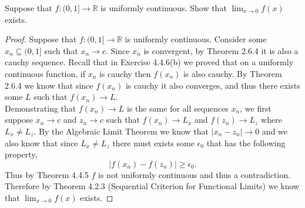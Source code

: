 \documentclass[12pt]{article}
\makeatletter
\theoremstyle{homework}
\newenvironment{exercise}[1]
{\def\@currentlabel{#1}\exercisecore}
{\endexercisecore}
\newcommand{\Reals}{\ensuremath{\mathbb R}}
\makeatother
\begin{document}
\begin{exercise}{3} Suppose that $f: (0,1]\to \Reals$ is uniformly continuous. Show that $\lim_{x\to 0} f(x)$ exists. 

  \begin{proof}

    Suppose that $f: (0,1]\to \Reals$ is uniformly continuous. Consider some $x_n \subseteq (0,1]$ such that $x_n \to c$. Since $x_n$ is convergent, by 
    Theorem 2.6.4 it is also a cauchy sequence. Recall that in Exercise 4.4.6(b) we proved that on a uniformly continuous function, if $x_n$ is cauchy then $f(x_n)$ is also cauchy.
    By Theorem 2.6.4 we know that since $f(x_n)$ is cauchy it also converges, and thus there exists some $L$ such that $f(x_n) \to L$.\\

    Demonstrating that $f(x_n) \to L$ is the same for all sequences $x_n$, we first suppose $x_n \to c$ and $z_n \to c$ such that $f(x_n)\to L_x$ and $f(z_n)\to L_z$
    where $L_x \neq L_z$. By the Algebraic Limit Theorem we know that $|x_n - z_n| \to 0$ and we also know that since $L_x \neq L_z$ there must exists some $\epsilon_0$ that has the following property,
    \begin{equation*}
      |f(x_n) - f(z_n)|\geq \epsilon_0.
    \end{equation*}
    Thus by Theorem 4.4.5 $f$ is not uniformly continuous and thus a contradiction. Therefore by Theorem 4.2.3 (Sequential Criterion for Functional Limits) we know that  $\lim_{x\to 0} f(x)$ exists. 
  
  \end{proof}


\end{exercise}
\vspace{.5in}
\end{document}
